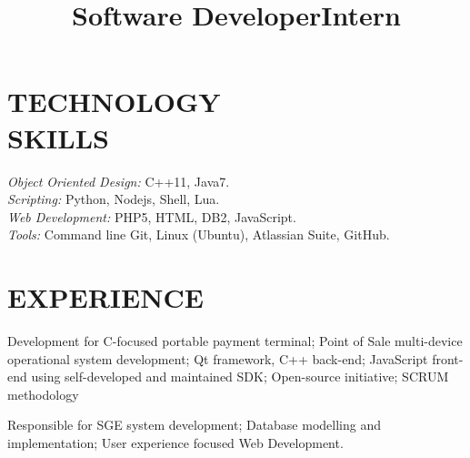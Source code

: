\documentclass[margin, 10pt]{res} %
\begin{document}
\begin{resume}
\section{TECHNOLOGY \\ SKILLS} 

{\sl Object Oriented Design:} C++11, Java7. \\
{\sl Scripting:} Python, Nodejs, Shell, Lua. \\
{\sl Web Development:} PHP5, HTML, DB2, JavaScript. \\
{\sl Tools:} Command line Git, Linux (Ubuntu), Atlassian Suite, GitHub. \\
 
 
\section{EXPERIENCE}
	\title{Software Developer}
	\begin{position}%
	Development for C-focused portable payment terminal; Point of Sale multi-device operational system development; Qt framework, C++ back-end; JavaScript front-end using self-developed and maintained SDK; Open-source initiative; SCRUM methodology
	\end{position}

	\title{Intern}
	\begin{position}%
		Responsible for SGE system development; Database modelling and implementation; User experience focused Web Development.
	\end{position}
\end{resume}
\end{document}
